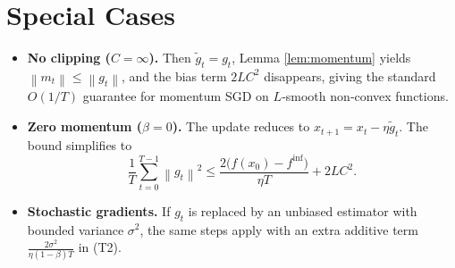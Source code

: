\documentclass{article}
\newcommand{\norm}[1]{\left\lVert#1\right\rVert}
\begin{document}
\section*{Special Cases}
\begin{itemize}
    \item \textbf{No clipping ($C=\infty$).} Then $\tilde g_t=g_t$, Lemma \ref{lem:momentum} yields $\norm{m_t}\le \norm{g_t}$, and the bias term $2LC^2$ disappears, giving the standard $O(1/T)$ guarantee for momentum SGD on $L$‑smooth non‑convex functions.
    \item \textbf{Zero momentum ($\beta=0$).} The update reduces to $x_{t+1}=x_t-\eta\tilde g_t$. The bound simplifies to
    \[
        \frac{1}{T}\sum_{t=0}^{T-1}\norm{g_t}^2
        \le \frac{2\bigl(f(x_0)-f^{\inf}\bigr)}{\eta T}+2LC^2 .
    \]
    \item \textbf{Stochastic gradients.} If $g_t$ is replaced by an unbiased estimator with bounded variance $\sigma^2$, the same steps apply with an extra additive term $\frac{2\sigma^2}{\eta(1-\beta)T}$ in (T2).
\end{itemize}
\end{document}
